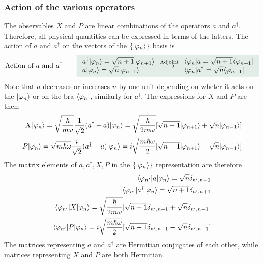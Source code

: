 \subsubsection{Action of the various operators}
The observables $X$ and $P$ are linear combinations of the operators $a$ and $a^\dagger$. Therefore, all physical quantities can be expressed in terms of the latters.
The action of $a$ and $a^\dagger$ on the vectors of the $\{|\varphi_n\rangle\}$ basis is 
\begin{align}
    \text{Action of $a$ and $a^\dagger$}\qquad
    \highlight{
    \begin{array}{l}
    a^\dagger\ket{\varphi_n}=\sqrt{n+1}\ket{\varphi_{n+1}}\\
    a\ket{\varphi_n}=\sqrt{n}\ket{\varphi_{n-1}}\end{array}\stackrel{\text{Adjoint}}{\longrightarrow}
    \begin{array}{l}
    \bra{\varphi_n}a=\sqrt{n+1}\bra{\varphi_{n+1}}\\
    \bra{\varphi_n}a^\dagger=\sqrt{n}\bra{\varphi_{n-1}} 
    \end{array}}
    \label{eq:actionofaa}
\end{align}
Note that $a$ decreases or increases $n$ by one unit depending on wheter it acts on the $|\varphi_n\rangle$ or on the bra $\langle\varphi_n|$, similarly for $a^\dagger$.
The expressions for $X$ and $P$ are then:
\begin{align}
    X|\varphi_n\rangle=\sqrt{\frac{\hbar}{m\omega}}\frac{1}{\sqrt{2}}(a^\dagger+a)|\varphi_n\rangle=\sqrt{\frac{\hbar}{2m\omega}}[\sqrt{n+1}|\varphi_{n+1}\rangle+\sqrt{n}|\varphi_{n-1}\rangle]\\
    P|\varphi_n\rangle=\sqrt{m\hbar\omega}\frac{i}{\sqrt{2}}(a^\dagger-a)|\varphi_n\rangle=i\sqrt{\frac{m\hbar\omega}{2}}[\sqrt{n+1}|\varphi_{n+1}\rangle-\sqrt{n}|\varphi_{n-1}\rangle]
    \label{eq:XPintermsofaa}
\end{align}
The matrix elements of $a,a^\dagger,X,P$ in the $\{|\varphi_n\rangle\}$ representation are therefore
\begin{align}
    \langle\varphi_{n'}|a|\varphi_n\rangle=\sqrt{n}\delta_{n',n-1}\\
    \langle\varphi_{n'}|a^\dagger|\varphi_n\rangle=\sqrt{n+1}\delta_{n',n+1}\\
    \langle\varphi_{n'}|X|\varphi_n\rangle=\sqrt{\frac{\hbar}{2m\omega}}[\sqrt{n+1}\delta_{n',n+1}+\sqrt{n}\delta_{n',n-1}]\\
    \langle\varphi_{n'}|P|\varphi_n\rangle=i\sqrt{\frac{m\hbar\omega}{2}}[\sqrt{n+1}\delta_{n',n+1}-\sqrt{n}\delta_{n',n-1}]
\end{align}
The matrices representing $a$ and $a^\dagger$ are Hermitian conjugates of each other, while matrices representing $X$ and $P$ are both Hermitian.
%
